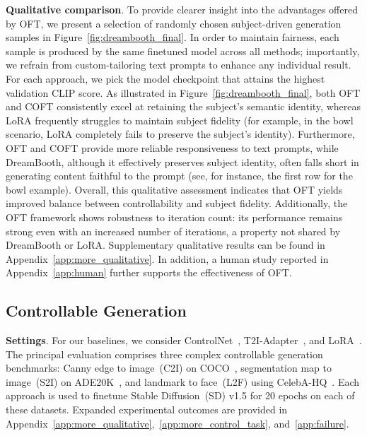 \textbf{Qualitative comparison}. To provide clearer insight into the advantages offered by OFT, we present a selection of randomly chosen subject-driven generation samples in Figure~\ref{fig:dreambooth_final}. In order to maintain fairness, each sample is produced by the same finetuned model across all methods; importantly, we refrain from custom-tailoring text prompts to enhance any individual result. For each approach, we pick the model checkpoint that attains the highest validation CLIP score. As illustrated in Figure~\ref{fig:dreambooth_final}, both OFT and COFT consistently excel at retaining the subject's semantic identity, whereas LoRA frequently struggles to maintain subject fidelity (for example, in the bowl scenario, LoRA completely fails to preserve the subject's identity). Furthermore, OFT and COFT provide more reliable responsiveness to text prompts, while DreamBooth, although it effectively preserves subject identity, often falls short in generating content faithful to the prompt (see, for instance, the first row for the bowl example). Overall, this qualitative assessment indicates that OFT yields improved balance between controllability and subject fidelity. Additionally, the OFT framework shows robustness to iteration count: its performance remains strong even with an increased number of iterations, a property not shared by DreamBooth or LoRA. Supplementary qualitative results can be found in Appendix~\ref{app:more_qualitative}. In addition, a human study reported in Appendix~\ref{app:human} further supports the effectiveness of OFT.

\subsection{Controllable Generation}

\textbf{Settings}. For our baselines, we consider ControlNet~\cite{zhang2023adding}, T2I-Adapter~\cite{mou2023t2i}, and LoRA~\cite{hulora2022}. The principal evaluation comprises three complex controllable generation benchmarks: Canny edge to image~(C2I) on COCO~\cite{lin2014microsoft}, segmentation map to image~(S2I) on ADE20K~\cite{zhou2017scene}, and landmark to face~(L2F) using CelebA-HQ~\cite{karras2018progressive,xia2021tedigan}. Each approach is used to finetune Stable Diffusion~(SD) v1.5 for 20 epochs on each of these datasets. Expanded experimental outcomes are provided in Appendix~\ref{app:more_qualitative},~\ref{app:more_control_task}, and~\ref{app:failure}.

